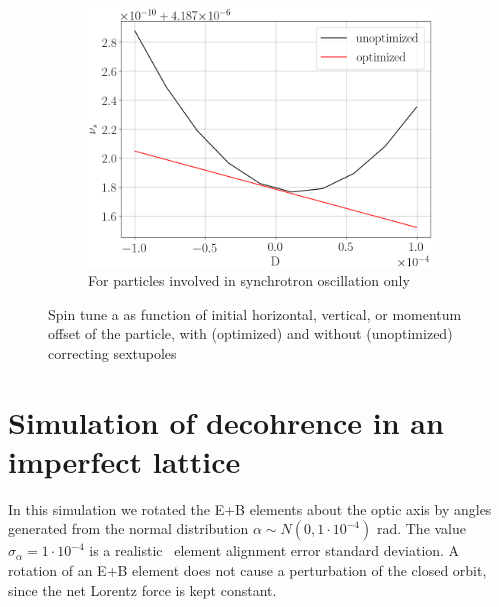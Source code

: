 \documentclass[a4paper]{jacow}
\newcommand{\subwidth}{.9\linewidth}
\begin{document}
\begin{figure}[ht]
\begin{subfigure}{\subwidth}
    \centering
    \includegraphics[width=\linewidth]{../img/IPAC19/spin_tune_decoh_d_offset}
    \caption{For particles involved in synchrotron oscillation only\label{fig:st_decoh_synchrotron}}
  \end{subfigure}
  \caption{Spin tune a as function of initial horizontal, vertical, or momentum offset of the particle,
    with (optimized) and without (unoptimized) correcting sextupoles\label{fig:decoherence_suppression_sim}}
\end{figure}

\section{Simulation of decohrence in an imperfect lattice}
In this simulation we rotated the E+B elements about the optic axis by angles generated from the
normal distribution $\alpha \sim N(0, 1\cdot 10^{-4})$ rad. The value $\sigma_\alpha = 1\cdot 10^{-4}$ is
a realistic~\cite{Senichev:FDM} element alignment error standard deviation. A rotation of an E+B element
does not cause a perturbation of the closed orbit, since the net Lorentz force is kept constant.
\end{document}
